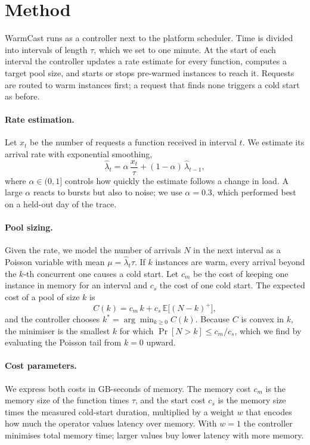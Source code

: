 \section{Method}
\label{sec:method}

WarmCast runs as a controller next to the platform scheduler. Time is divided
into intervals of length $\tau$, which we set to one minute. At the start of
each interval the controller updates a rate estimate for every function,
computes a target pool size, and starts or stops pre-warmed instances to
reach it. Requests are routed to warm instances first; a request that finds
none triggers a cold start as before.

\paragraph{Rate estimation.}
Let $x_t$ be the number of requests a function received in interval $t$. We
estimate its arrival rate with exponential smoothing,
\begin{equation}
  \hat{\lambda}_t = \alpha \, \frac{x_t}{\tau} + (1 - \alpha) \, \hat{\lambda}_{t-1},
  \label{eq:ewma}
\end{equation}
where $\alpha \in (0, 1]$ controls how quickly the estimate follows a change
in load. A large $\alpha$ reacts to bursts but also to noise; we use
$\alpha = 0.3$, which performed best on a held-out day of the trace.

\paragraph{Pool sizing.}
Given the rate, we model the number of arrivals $N$ in the next interval as a
Poisson variable with mean $\mu = \hat{\lambda}_t \tau$. If $k$ instances are
warm, every arrival beyond the $k$-th concurrent one causes a cold start. Let
$c_m$ be the cost of keeping one instance in memory for an interval and $c_s$
the cost of one cold start. The expected cost of a pool of size $k$ is
\begin{equation}
  C(k) = c_m \, k + c_s \, \mathbb{E}\big[(N - k)^{+}\big],
  \label{eq:cost}
\end{equation}
and the controller chooses $k^{*} = \arg\min_{k \ge 0} C(k)$. Because $C$ is
convex in $k$, the minimiser is the smallest $k$ for which
$\Pr[N > k] \le c_m / c_s$, which we find by evaluating the Poisson tail from
$k = 0$ upward.

\paragraph{Cost parameters.}
We express both costs in GB-seconds of memory. The memory cost $c_m$ is the
memory size of the function times $\tau$, and the start cost $c_s$ is the
memory size times the measured cold-start duration, multiplied by a weight
$w$ that encodes how much the operator values latency over memory. With
$w = 1$ the controller minimises total memory time; larger values buy lower
latency with more memory.


